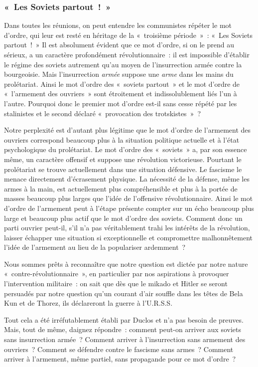 \documentclass[french,twoside]{book} %
\begin{document}
\subsubsection[{« Les Soviets partout ! »}]{« Les Soviets partout ! »}
\noindent Dans toutes les réunions, on peut entendre les communistes répéter le mot d’ordre, qui leur est resté en héritage de la « troisième période » : « Les Soviets partout ! » Il est absolument évident que ce mot d’ordre, si on le prend au sérieux, a un caractère profondément révolutionnaire : il est impossible d’établir le régime des soviets autrement qu’au moyen de l’insurrection armée contre la bourgeoisie. Mais l’insurrection \emph{armée} suppose une \emph{arme} dans les mains du prolétariat. Ainsi le mot d’ordre des « soviets partout » et le mot d’ordre de « l’armement des ouvriers » sont étroitement et indissolublement liés l’un à l’autre. Pourquoi donc le premier mot d’ordre est-il sans cesse répété par les stalinistes et le second déclaré « provocation des trotskistes » ?\par
 Notre perplexité est d’autant plus légitime que le mot d’ordre de l’armement des ouvriers correspond beaucoup plus à la situation politique actuelle et à l’état psychologique du prolétariat. Le mot d’ordre des « soviets » a, par son essence même, un caractère offensif et suppose une révolution victorieuse. Pourtant le prolétariat se trouve actuellement dans une situation défensive. Le fascisme le menace directement d’écrasement physique. La nécessité de la défense, même les armes à la main, est actuellement plus compréhensible et plus à la portée de masses beaucoup plus larges que l’idée de l’offensive révolutionnaire. Ainsi le mot d’ordre de l’armement peut à l’étape présente compter sur un écho beaucoup plus large et beaucoup plus actif que le mot d’ordre des soviets. Comment donc un parti ouvrier peut-il, s’il n’a pas véritablement trahi les intérêts de la révolution, laisser échapper une situation si exceptionnelle et compromettre malhonnêtement l’idée de l’armement au lieu de la populariser ardemment ?\par
Nous sommes prêts à reconnaître que notre question est dictée par notre nature « contre-révolutionnaire », en particulier par nos aspirations à provoquer l’intervention militaire : on sait que dès que le mikado et Hitler se seront persuadés par notre question qu’un courant d’air souffle dans les têtes de Bela Kun et de Thorez, ils déclareront la guerre à l’U.R.S.S.\par
Tout cela a été irréfutablement établi par Duclos et n’a pas besoin de preuves. Mais, tout de même, daignez répondre : comment peut-on arriver aux soviets sans insurrection armée ? Comment arriver à l’insurrection sans armement des ouvriers ? Comment se défendre contre le fascisme sans armes ? Comment arriver à l’armement, même partiel, sans propagande pour ce mot d’ordre ?
\end{document}
